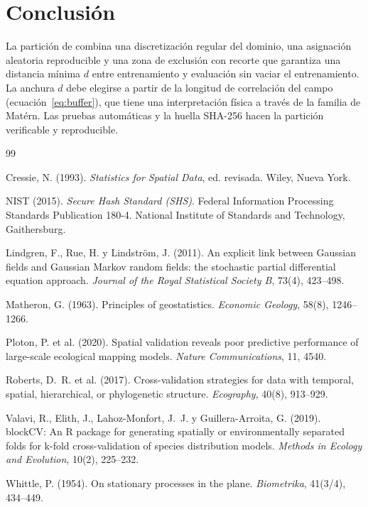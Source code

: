 \documentclass[11pt,a4paper]{article}
\newcommand{\codigo}[1]{\cpcodigo{#1}}
\begin{document}
\section{Conclusión}

La partición de \codigo{modelo/clima.py} combina una discretización regular del dominio, una asignación
aleatoria reproducible y una zona de exclusión con recorte que garantiza una distancia mínima $d$ entre
entrenamiento y evaluación sin vaciar el entrenamiento. La anchura $d$ debe elegirse a partir de la
longitud de correlación del campo (ecuación~\ref{eq:buffer}), que tiene una interpretación física a
través de la familia de Matérn. Las pruebas automáticas y la huella SHA-256 hacen la partición
verificable y reproducible.

\begin{thebibliography}{99}\small

 Cressie, N. (1993). \emph{Statistics for Spatial Data}, ed. revisada. Wiley, Nueva
York.

 NIST (2015). \emph{Secure Hash Standard (SHS)}. Federal Information Processing
Standards Publication 180-4. National Institute of Standards and Technology, Gaithersburg.

 Lindgren, F., Rue, H. y Lindström, J. (2011). An explicit link between Gaussian
fields and Gaussian Markov random fields: the stochastic partial differential equation approach.
\emph{Journal of the Royal Statistical Society B}, 73(4), 423--498.

 Matheron, G. (1963). Principles of geostatistics. \emph{Economic Geology}, 58(8),
1246--1266.

 Ploton, P. et al. (2020). Spatial validation reveals poor predictive performance of
large-scale ecological mapping models. \emph{Nature Communications}, 11, 4540.

 Roberts, D.~R. et al. (2017). Cross-validation strategies for data with temporal,
spatial, hierarchical, or phylogenetic structure. \emph{Ecography}, 40(8), 913--929.

 Valavi, R., Elith, J., Lahoz-Monfort, J.~J. y Guillera-Arroita, G. (2019). blockCV:
An R package for generating spatially or environmentally separated folds for k-fold cross-validation of
species distribution models. \emph{Methods in Ecology and Evolution}, 10(2), 225--232.

 Whittle, P. (1954). On stationary processes in the plane. \emph{Biometrika}, 41(3/4),
434--449.

\end{thebibliography}
\end{document}
